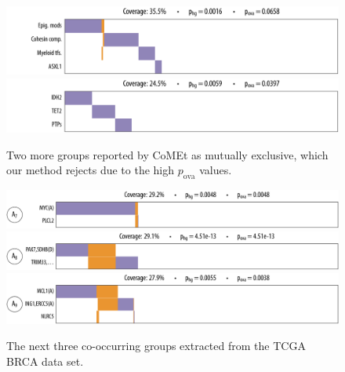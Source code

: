 \begin{figure}[htbp]
\centering
\includegraphics[width=\textwidth]{figures/genes/aml_comet1.pdf}\\[2em]
\includegraphics[width=\textwidth]{figures/genes/aml_comet2.pdf}\\[2em]
\caption{Two more groups reported by CoMEt as mutually exclusive, which our method rejects due to the high $p_{\textrm{ova}}$ values.}
\label{fig:comet_aml}
\end{figure}
\vspace{3em}
\begin{figure}[htbp]
\centering
\includegraphics[width=\textwidth]{figures/genes/brca_9_a.pdf}\\[1.2em]
\includegraphics[width=\textwidth]{figures/genes/brca_13_a.pdf}\\[1.2em]
\includegraphics[width=\textwidth]{figures/genes/brca_5_a.pdf}\\[1.2em]
\caption{The next three co-occurring groups extracted from the TCGA BRCA data set.}
\label{fig:att_brca_2}
\end{figure}

